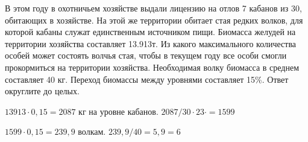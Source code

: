 
В этом году в охотничьем хозяйстве выдали лицензию на отлов 7 кабанов из 30, 
обитающих в хозяйстве. На этой же территории обитает стая редких волков, для 
которой кабаны служат единственным источником пищи. Биомасса желудей на территории 
хозяйства составляет 13.913т. Из какого максимального количества особей может состоять волчья 
стая, чтобы в текущем году все особи смогли прокормиться на территории хозяйства. 
Необходимая волку биомасса в среднем составляет 40 кг. Переход биомассы между уровнями составляет 15\%. 
Ответ округлите до целых.

\soultionSection

$13913 \cdot 0,15=2087$ кг на уровне кабанов. $2087/30 \cdot 23 \cdot =1599$   

$1599 \cdot 0,15=239,9$ волкам. $239,9/40 = 5,9 = 6$

